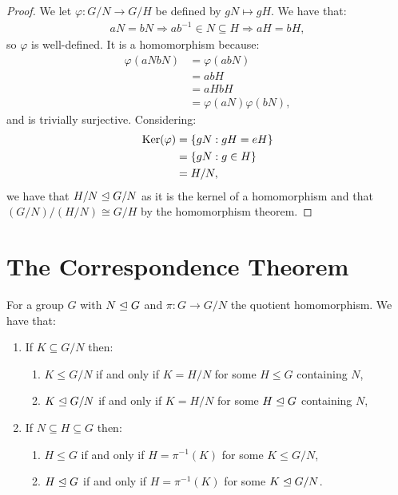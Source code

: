 \begin{proof}
    We let $\varphi : G/N \to G/H$ be defined by $gN \mapsto gH$.
    We have that: \begin{align*}
        aN = bN \Rightarrow ab^{-1} \in N \subseteq H \Rightarrow aH = bH,
    \end{align*} so $\varphi$ is well-defined. It is a homomorphism
    because: \begin{align*}
        \varphi(aNbN) &= \varphi(abN) \\
        &= abH \\
        &= aHbH \\
        &= \varphi(aN)\varphi(bN),
    \end{align*} and is trivially surjective. Considering: \begin{align*}
        \operatorname{Ker}(\varphi) 
        &= \{gN : gH = eH\} \\
        &= \{gN : g \in H\} \\
        &= H/N,
    \end{align*} we have that $H / N \trianglelefteq G / N$ as it is the kernel
    of a homomorphism and that \linebreak 
    $(G / N)/(H / N) \cong G / H$ by the
    homomorphism theorem.
\end{proof}

\section{The Correspondence Theorem}

For a group $G$ with $N \trianglelefteq G$ and $\pi : G \to G/N$ the quotient 
homomorphism. We have that: \begin{enumerate}
    \item If $K \subseteq G/N$ then: \begin{enumerate}
        \item $K \leq G/N$ if and only if $K = H/N$ for some
            $H \leq G$ containing $N$,
        \item $K \trianglelefteq G/N$ if and only if $K = H/N$ for some
            $H \trianglelefteq G$ containing $N$,
    \end{enumerate}
    \item If $N \subseteq H \subseteq G$ then: \begin{enumerate}
        \item $H \leq G$ if and only if $H = \pi^{-1}(K)$
            for some $K \leq G/N$,
        \item $H \trianglelefteq G$ if and only if $H = \pi^{-1}(K)$
            for some $K \trianglelefteq G/N$.
    \end{enumerate}
\end{enumerate}

